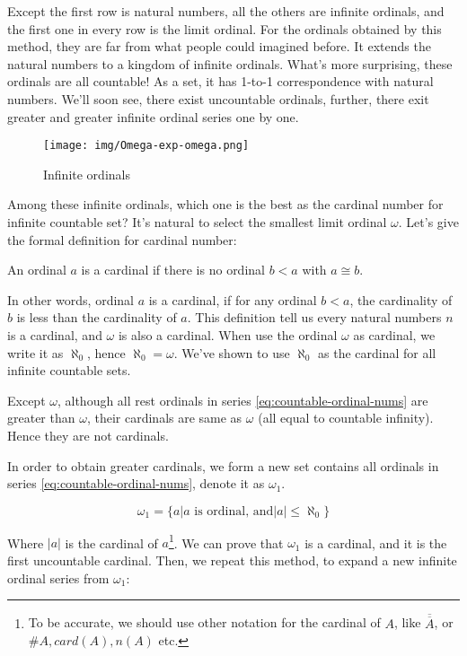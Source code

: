 \documentclass{article}
\begin{document}
Except the first row is natural numbers, all the others are infinite ordinals, and the first one in every row is the limit ordinal. For the ordinals obtained by this method, they are far from what people could imagined before. It extends the natural numbers to a kingdom of infinite ordinals. What's more surprising, these ordinals are all countable! As a set, it has 1-to-1 correspondence with natural numbers. We'll soon see, there exist uncountable ordinals, further, there exit greater and greater infinite ordinal series one by one.

\begin{figure}[htbp]
 \centering
 \texttt{[image: img/Omega-exp-omega.png]}
 \caption{Infinite ordinals}
 \label{fig:infinite-ordinals}
\end{figure}

Among these infinite ordinals, which one is the best as the cardinal number for infinite countable set? It's natural to select the smallest limit ordinal $\omega$. Let's give the formal definition for cardinal number:

\begin{definition}
An ordinal $a$ is a cardinal if there is no ordinal $b < a$ with $ a \cong b$.
\end{definition}

In other words, ordinal $a$ is a cardinal, if for any ordinal $b < a$, the cardinality of $b$ is less than the cardinality of $a$. This definition tell us every natural numbers $n$ is a cardinal, and $\omega$ is also a cardinal. When use the ordinal $\omega$ as cardinal, we write it as $\aleph_0$, hence $\aleph_0 = \omega$. We've shown to use $\aleph_0$ as the cardinal for all infinite countable sets.

Except $\omega$, although all rest ordinals in series \ref{eq:countable-ordinal-nums} are greater than $\omega$, their cardinals are same as $\omega$ (all equal to countable infinity). Hence they are not cardinals.

In order to obtain greater cardinals, we form a new set contains all ordinals in series \ref{eq:countable-ordinal-nums}, denote it as $\omega_1$.

\[
\omega_1 = \{ a | a \text{ is ordinal, and} |a| \leq \aleph_0\}
\]

Where $|a|$ is the cardinal of $a$\footnote{To be accurate, we should use other notation for the cardinal of $A$, like $\overline{\overline{A}}$, or $\#A, card(A), n(A)$ etc.}. We can prove that $\omega_1$ is a cardinal, and it is the first uncountable cardinal. Then, we repeat this method, to expand a new infinite ordinal series from $\omega_1$:
\end{document}

